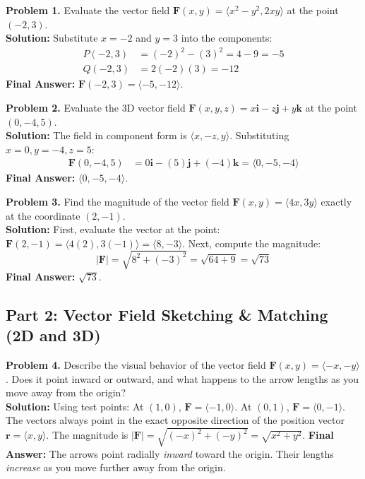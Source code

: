 \documentclass[11pt]{article}
\begin{document}
\textbf{Problem 1.} Evaluate the vector field $\mathbf{F}(x, y) = \langle x^2 - y^2, 2xy \rangle$ at the point $(-2, 3)$. \\
\textbf{Solution:} 
Substitute $x = -2$ and $y = 3$ into the components:
\begin{align*}
    P(-2, 3) &= (-2)^2 - (3)^2 = 4 - 9 = -5 \\
    Q(-2, 3) &= 2(-2)(3) = -12
\end{align*}
\textbf{Final Answer:} $\mathbf{F}(-2, 3) = \langle -5, -12 \rangle$.

\vspace{0.3cm}
\textbf{Problem 2.} Evaluate the 3D vector field $\mathbf{F}(x, y, z) = x\mathbf{i} - z\mathbf{j} + y\mathbf{k}$ at the point $(0, -4, 5)$. \\
\textbf{Solution:}
The field in component form is $\langle x, -z, y \rangle$. Substituting $x = 0, y = -4, z = 5$:
\begin{align*}
    \mathbf{F}(0, -4, 5) &= 0\mathbf{i} - (5)\mathbf{j} + (-4)\mathbf{k} = \langle 0, -5, -4 \rangle
\end{align*}
\textbf{Final Answer:} $\langle 0, -5, -4 \rangle$.

\vspace{0.3cm}
\textbf{Problem 3.} Find the magnitude of the vector field $\mathbf{F}(x, y) = \langle 4x, 3y \rangle$ exactly at the coordinate $(2, -1)$. \\
\textbf{Solution:}
First, evaluate the vector at the point: $\mathbf{F}(2, -1) = \langle 4(2), 3(-1) \rangle = \langle 8, -3 \rangle$. 
Next, compute the magnitude:
$$|\mathbf{F}| = \sqrt{8^2 + (-3)^2} = \sqrt{64 + 9} = \sqrt{73}$$
\textbf{Final Answer:} $\sqrt{73}$.

\subsection*{Part 2: Vector Field Sketching \& Matching (2D and 3D)}

\textbf{Problem 4.} Describe the visual behavior of the vector field $\mathbf{F}(x, y) = \langle -x, -y \rangle$. Does it point inward or outward, and what happens to the arrow lengths as you move away from the origin? \\
\textbf{Solution:}
Using test points: At $(1,0)$, $\mathbf{F} = \langle -1, 0 \rangle$. At $(0,1)$, $\mathbf{F} = \langle 0, -1 \rangle$. The vectors always point in the exact opposite direction of the position vector $\mathbf{r} = \langle x, y \rangle$. 
The magnitude is $|\mathbf{F}| = \sqrt{(-x)^2 + (-y)^2} = \sqrt{x^2+y^2}$. 
\textbf{Final Answer:} The arrows point radially \textit{inward} toward the origin. Their lengths \textit{increase} as you move further away from the origin.
\end{document}
